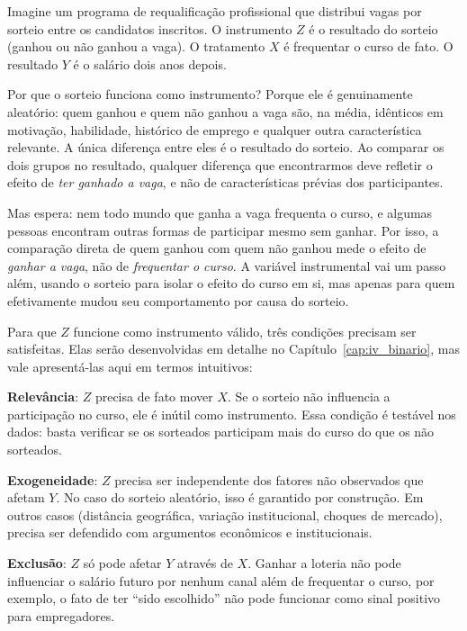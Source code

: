 \begin{exemplobox}
Imagine um programa de requalificação profissional que distribui vagas por sorteio entre os candidatos inscritos. O instrumento $Z$ é o resultado do sorteio (ganhou ou não ganhou a vaga). O tratamento $X$ é frequentar o curso de fato. O resultado $Y$ é o salário dois anos depois.

Por que o sorteio funciona como instrumento? Porque ele é genuinamente aleatório: quem ganhou e quem não ganhou a vaga são, na média, idênticos em motivação, habilidade, histórico de emprego e qualquer outra característica relevante. A única diferença entre eles é o resultado do sorteio. Ao comparar os dois grupos no resultado, qualquer diferença que encontrarmos deve refletir o efeito de \textit{ter ganhado a vaga}, e não de características prévias dos participantes.

Mas espera: nem todo mundo que ganha a vaga frequenta o curso, e algumas pessoas encontram outras formas de participar mesmo sem ganhar. Por isso, a comparação direta de quem ganhou com quem não ganhou mede o efeito de \textit{ganhar a vaga}, não de \textit{frequentar o curso}. A variável instrumental vai um passo além, usando o sorteio para isolar o efeito do curso em si, mas apenas para quem efetivamente mudou seu comportamento por causa do sorteio.
\end{exemplobox}

Para que $Z$ funcione como instrumento válido, três condições precisam ser satisfeitas. Elas serão desenvolvidas em detalhe no Capítulo~\ref{cap:iv_binario}, mas vale apresentá-las aqui em termos intuitivos:

\textbf{Relevância}: $Z$ precisa de fato mover $X$. Se o sorteio não influencia a participação no curso, ele é inútil como instrumento. Essa condição é testável nos dados: basta verificar se os sorteados participam mais do curso do que os não sorteados.

\textbf{Exogeneidade}: $Z$ precisa ser independente dos fatores não observados que afetam $Y$. No caso do sorteio aleatório, isso é garantido por construção. Em outros casos (distância geográfica, variação institucional, choques de mercado), precisa ser defendido com argumentos econômicos e institucionais.

\textbf{Exclusão}: $Z$ só pode afetar $Y$ através de $X$. Ganhar a loteria não pode influenciar o salário futuro por nenhum canal além de frequentar o curso, por exemplo, o fato de ter ``sido escolhido'' não pode funcionar como sinal positivo para empregadores.

